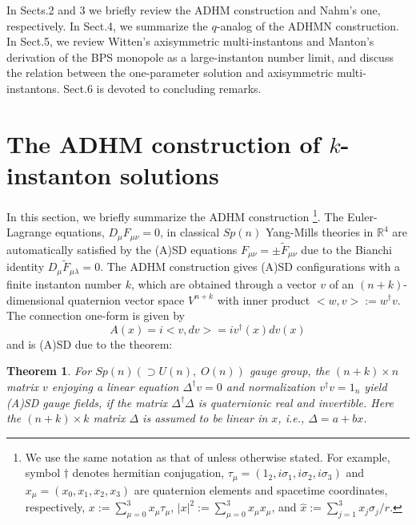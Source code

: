 \documentclass[a4paper,10pt]{article}
\newtheorem{thm}{Theorem}
\newcommand{\ie}{\textit{i.e.}}
\begin{document}
In Sects.2 and 3 we briefly review the ADHM construction and Nahm's one, respectively. 
In Sect.4, we summarize the $q$-analog of the ADHMN construction.
In Sect.5, we review Witten's axisymmetric multi-instantons and Manton's derivation of the BPS monopole as a large-instanton number limit, and discuss the relation between the one-parameter solution and axisymmetric multi-instantons.
Sect.6 is devoted to concluding remarks.
\section{The ADHM construction of $k$-instanton solutions}

In this section, we briefly summarize the ADHM construction \cite{AHDM,DM,Corri}
\footnote[1]{We use the same notation as that of \cite{KN} unless otherwise stated. For example, symbol $\dagger$ denotes hermitian conjugation, $\tau_\mu=(1_2,i\sigma_1,i\sigma_2,i\sigma_3)$ and $x_\mu=(x_0,x_1,x_2,x_3)$ are quaternion elements and spacetime coordinates, respectively, $x:=\sum^3_{\mu=0}x_\mu\tau_\mu$, $|x|^2:=\sum^3_{\mu=0}x_\mu x_\mu$, and $ \hat x:=\sum_{j=1}^3x_j\sigma_j/r$.}.
The Euler-Lagrange equations, $D_\mu F_{\mu\nu}=0$, in classical $Sp(n)$ Yang-Mills theories in $\mathbb{R}^4$ are automatically satisfied by the (A)SD equations $F_{\mu\nu}=\pm\tilde F_{\mu\nu}$ due to the Bianchi identity $D_\mu \tilde F_{\mu\lambda}=0$.
The ADHM construction gives (A)SD configurations with a finite instanton number $k$, which are obtained through a vector $v$ of an $(n+k)$-dimensional quaternion vector space $V^{n+k}$ with inner product $<w,v>:=w^\dagger v$.
The connection one-form is given by
\begin{equation}
A(x)=i<v, dv>=iv^\dagger(x)dv(x) \label{eq:A}
\end{equation}
and is (A)SD due to the theorem:
\begin{thm} {\rm \cite{AHDM}} 
For $Sp(n)(\supset U(n),\;O(n))$ gauge group, the $(n+k)\times n$ matrix $v$ enjoying a linear equation 
$\Delta^\dagger v=0$ and normalization $v^\dagger v=1_n$ yield (A)SD gauge fields, if the matrix $\Delta^\dagger \Delta$ is quaternionic real and invertible. Here the $(n+k)\times k$ matrix $\Delta$ is assumed to be linear in $x$, \ie, $ \Delta=a+bx$.
\end{thm}
\end{document}
